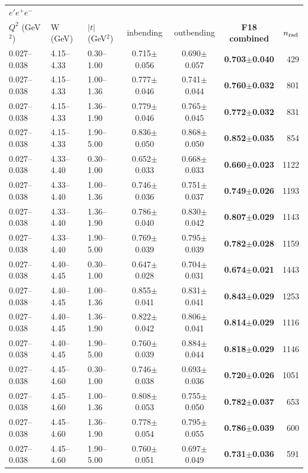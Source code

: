 \medskip

\begin{tabular}{lllcccr}\toprule
\multicolumn{7}{l}{$e'e^+e^-$}\\
$Q^2$ (GeV$^2$) & W (GeV) & $|t|$ (GeV$^2$) & inbending & outbending & \textbf{F18 combined} & $n_{\rm rad}$ \\\midrule
0.027--0.038 & 4.15--4.33 & 0.30--1.00 & 0.715$\pm$0.056 & 0.690$\pm$0.057 & \textbf{0.703$\pm$0.040} & 429 \\
0.027--0.038 & 4.15--4.33 & 1.00--1.36 & 0.777$\pm$0.046 & 0.741$\pm$0.044 & \textbf{0.760$\pm$0.032} & 801 \\
0.027--0.038 & 4.15--4.33 & 1.36--1.90 & 0.779$\pm$0.046 & 0.765$\pm$0.045 & \textbf{0.772$\pm$0.032} & 831 \\
0.027--0.038 & 4.15--4.33 & 1.90--5.00 & 0.836$\pm$0.050 & 0.868$\pm$0.050 & \textbf{0.852$\pm$0.035} & 854 \\
0.027--0.038 & 4.33--4.40 & 0.30--1.00 & 0.652$\pm$0.033 & 0.668$\pm$0.033 & \textbf{0.660$\pm$0.023} & 1122 \\
0.027--0.038 & 4.33--4.40 & 1.00--1.36 & 0.746$\pm$0.036 & 0.751$\pm$0.037 & \textbf{0.749$\pm$0.026} & 1193 \\
0.027--0.038 & 4.33--4.40 & 1.36--1.90 & 0.786$\pm$0.040 & 0.830$\pm$0.042 & \textbf{0.807$\pm$0.029} & 1143 \\
0.027--0.038 & 4.33--4.40 & 1.90--5.00 & 0.769$\pm$0.039 & 0.795$\pm$0.039 & \textbf{0.782$\pm$0.028} & 1159 \\
0.027--0.038 & 4.40--4.45 & 0.30--1.00 & 0.647$\pm$0.028 & 0.704$\pm$0.031 & \textbf{0.674$\pm$0.021} & 1443 \\
0.027--0.038 & 4.40--4.45 & 1.00--1.36 & 0.855$\pm$0.041 & 0.831$\pm$0.041 & \textbf{0.843$\pm$0.029} & 1253 \\
0.027--0.038 & 4.40--4.45 & 1.36--1.90 & 0.822$\pm$0.042 & 0.806$\pm$0.041 & \textbf{0.814$\pm$0.029} & 1116 \\
0.027--0.038 & 4.40--4.45 & 1.90--5.00 & 0.760$\pm$0.039 & 0.884$\pm$0.044 & \textbf{0.818$\pm$0.029} & 1146 \\
0.027--0.038 & 4.45--4.60 & 0.30--1.00 & 0.746$\pm$0.038 & 0.693$\pm$0.036 & \textbf{0.720$\pm$0.026} & 1051 \\
0.027--0.038 & 4.45--4.60 & 1.00--1.36 & 0.808$\pm$0.053 & 0.755$\pm$0.050 & \textbf{0.782$\pm$0.037} & 653 \\
0.027--0.038 & 4.45--4.60 & 1.36--1.90 & 0.778$\pm$0.054 & 0.795$\pm$0.055 & \textbf{0.786$\pm$0.039} & 600 \\
0.027--0.038 & 4.45--4.60 & 1.90--5.00 & 0.760$\pm$0.051 & 0.697$\pm$0.049 & \textbf{0.731$\pm$0.036} & 591 \\
\bottomrule\end{tabular}

